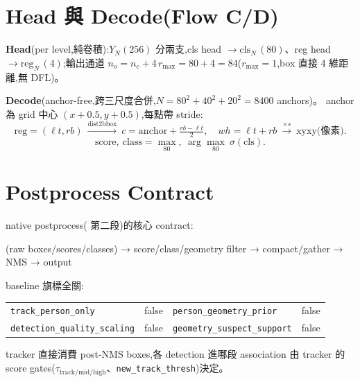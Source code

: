\section{Head 與 Decode(Flow C/D)}\label{sec:det-decode}
\textbf{Head}(per level,純卷積):\(Y_N(256)\) 分兩支,cls head
\(\to\mathrm{cls}_N\,(80)\)、reg head \(\to\mathrm{reg}_N\,(4)\);輸出通道
\(n_o=n_c+4\,r_{\max}=80+4=84\)(\(r_{\max}{=}1\),box 直接 4 維距離,無 DFL)。

\textbf{Decode}(anchor-free,跨三尺度合併,\(N=80^2{+}40^2{+}20^2=8400\) anchors)。
anchor 為 grid 中心 \((x{+}0.5,y{+}0.5)\),每點帶 stride:
\begin{equation}\label{eq:det-decode}
  \mathrm{reg}=(\ell t,rb)\ \xrightarrow{\text{dist2bbox}}\
  c=\mathrm{anchor}+\tfrac{rb-\ell t}{2},\quad
  wh=\ell t+rb\ \xrightarrow{\times s}\ \text{xyxy(像素)}.
\end{equation}
\begin{equation}\label{eq:det-cls}
  \text{score},\ \text{class}=\max_{80},\ \arg\max_{80}\ \sigma(\mathrm{cls}).
\end{equation}

\section{Postprocess Contract}\label{sec:det-post}
native postprocess( 第二段)的核心 contract:
\begin{center}\ttfamily\small
(raw boxes/scores/classes) → score/class/geometry filter → compact/gather → NMS → output
\end{center}
baseline 旗標全關:
\begin{center}\small
\begin{tabular}{@{}ll@{\qquad}ll@{}}
\texttt{track\_person\_only} & false &
\texttt{person\_geometry\_prior} & false \\
\texttt{detection\_quality\_scaling} & false &
\texttt{geometry\_suspect\_support} & false
\end{tabular}
\end{center}
tracker 直接消費 post-NMS boxes,各 detection 進哪段 association 由 tracker
的 score gates(\(\tau_{\mathrm{track/mid/high}}\)、\texttt{new\_track\_thresh})決定。

